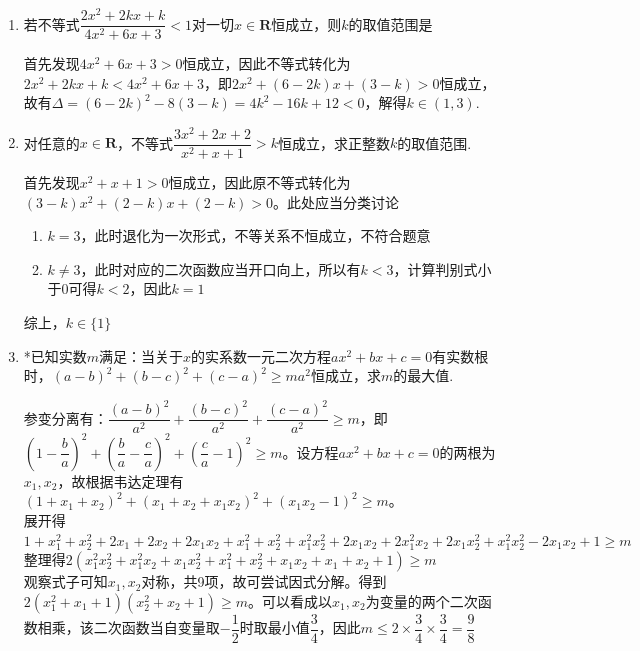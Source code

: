 \begin{enumerate}
\begin{enumerate}
\begin{jieda}
        \end{jieda}
        \item 若不等式$\dfrac{2x^2+2kx+k}{4x^2+6x+3} < 1$对一切$x \in \mathbf{R}$恒成立，则$k$的取值范围是
        \begin{jieda}
            首先发现$4x^2+6x+3 > 0$恒成立，因此不等式转化为$2x^2+2kx+k < 4x^2+6x+3$，即$2x^2 + (6-2k)x + (3-k) > 0$恒成立，故有$\Delta = (6-2k)^2 - 8(3-k) = 4k^2 -16k + 12 < 0$，解得$k \in (1,3)$.
        \end{jieda}
        \item 对任意的$x \in \mathbf{R}$，不等式$\dfrac{3x^2 + 2x + 2}{x^2+x+1} > k$恒成立，求正整数$k$的取值范围.
        \begin{jieda}
            首先发现$x^2+x+1 > 0$恒成立，因此原不等式转化为$(3-k)x^2 + (2-k)x + (2-k) > 0$。此处应当分类讨论
            \begin{enumerate}
                \item $k = 3$，此时退化为一次形式，不等关系不恒成立，不符合题意
                \item $k \neq 3$，此时对应的二次函数应当开口向上，所以有$k < 3$，计算判别式小于0可得$k < 2$，因此$k = 1$
            \end{enumerate}
            综上，$k \in \{1\}$
        \end{jieda}
        \item *已知实数$m$满足：当关于$x$的实系数一元二次方程$ax^2+bx+c=0$有实数根时，$(a-b)^2+(b-c)^2+(c-a)^2 \geq ma^2$恒成立，求$m$的最大值.
        \begin{jieda}
            参变分离有：$\dfrac{(a-b)^2}{a^2}+\dfrac{(b-c)^2}{a^2}+\dfrac{(c-a)^2}{a^2} \geq m$，即$(1-\dfrac{b}{a})^2 + (\dfrac{b}{a} - \dfrac{c}{a})^2 + (\dfrac{c}{a} - 1)^2 \geq m$。设方程$ax^2+bx+c=0$的两根为$x_1, x_2$，故根据韦达定理有$(1+x_1+x_2)^2 + (x_1+x_2+x_1x_2)^2 + (x_1x_2-1)^2 \geq m$。\\
            展开得$1+x_1^2+x_2^2+2x_1 + 2x_2+2x_1x_2 + x_1^2 + x_2^2 + x_1^2x_2^2 + 2x_1x_2 + 2x_1^2x_2 + 2x_1x_2^2 + x_1^2x_2^2 -2x_1x_2 + 1 \geq m$
            整理得$2(x_1^2x_2^2 + x_1^2x_2 + x_1x_2^2 + x_1^2 + x_2^2 + x_1x_2 + x_1 + x_2 + 1) \geq m$ \\
            观察式子可知$x_1, x_2$对称，共9项，故可尝试因式分解。得到$2(x_1^2 + x_1 + 1)(x_2^2 + x_2 + 1) \geq m$。可以看成以$x_1, x_2$为变量的两个二次函数相乘，该二次函数当自变量取$-\dfrac{1}{2}$时取最小值$\dfrac{3}{4}$，因此$m \leq 2 \times \dfrac{3}{4} \times \dfrac{3}{4} = \dfrac{9}{8}$
        \end{jieda} 

\end{enumerate}
\end{enumerate}
